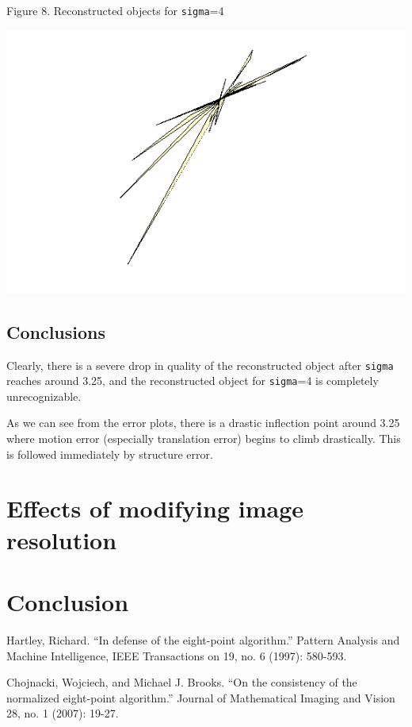 \documentclass{article}
\begin{document}
\begin{center}
	\newpage
	\begin{center}Figure 8. Reconstructed objects for \texttt{sigma}=4\end{center}
	\includegraphics[width=.5\textwidth]{4sigma.png}

\end{center}


\subsection{Conclusions}

Clearly, there is a severe drop in quality of the reconstructed object after \texttt{sigma} reaches around 3.25, and the reconstructed object for \texttt{sigma}=4 is completely unrecognizable.

As we can see from the error plots, there is a drastic inflection point around 3.25 where motion error (especially translation error) begins to climb drastically. This is followed immediately by structure error.







\newpage
\section{Effects of modifying image resolution}

\newpage
\section{Conclusion}

\newpage


\newpage
\begin{thebibliography}{99}
	Hartley, Richard. ``In defense of the eight-point algorithm.'' Pattern Analysis and Machine Intelligence, IEEE Transactions on 19, no. 6 (1997): 580-593.

	Chojnacki, Wojciech, and Michael J. Brooks. ``On the consistency of the normalized eight-point algorithm.'' Journal of Mathematical Imaging and Vision 28, no. 1 (2007): 19-27.
\end{thebibliography}
\end{document}
